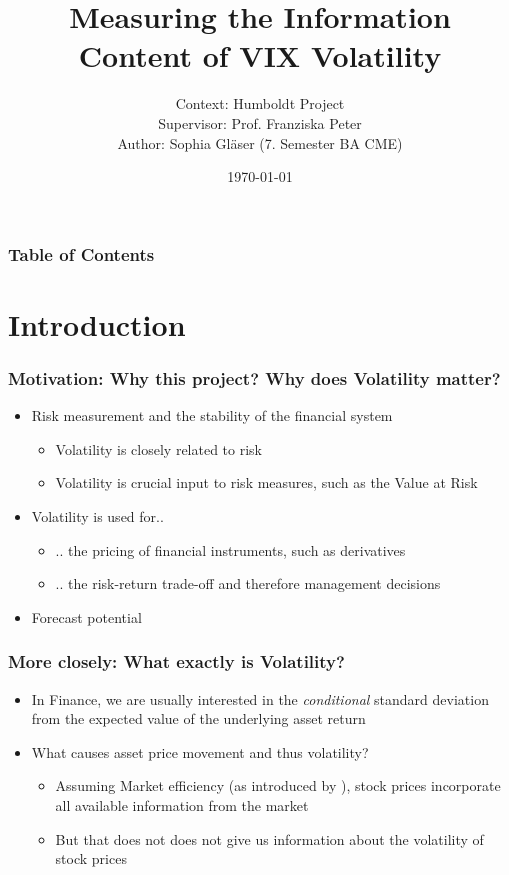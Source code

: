 \documentclass[aspectratio=169]{beamer}
\title{Measuring the Information Content of VIX Volatility}
\author{Context: Humboldt Project\\
Supervisor: Prof. Franziska Peter\\
Author: Sophia Gläser (7. Semester BA CME)}
\date{\small \today}
\begin{document}
\begin{frame}
\maketitle
\end{frame}

\begin{frame}
\frametitle{Table of Contents}
\tableofcontents
\end{frame}

\section{Introduction}

\begin{frame}
\frametitle{Motivation: Why this project? Why does Volatility matter?}
	\begin{itemize}
	\item<1-> Risk measurement and the stability of the financial system
		\begin{itemize}
		\item<1-> Volatility is closely related to risk 
		\item<1-> Volatility is crucial input to risk measures, such as the Value at Risk
		\end{itemize}
	\item<2-> Volatility is used for..
		\begin{itemize}
		\item<2-> .. the pricing of financial instruments, such as derivatives
		\item<2-> .. the risk-return trade-off and therefore management decisions
		\end{itemize}
	\item<3-> Forecast potential
	\end{itemize}
\end{frame}

\begin{frame}
\frametitle{More closely: What exactly is Volatility?}
	\begin{itemize}
	\item<1-> In Finance, we are usually interested in the \textit{conditional} standard deviation from the expected value of the underlying asset return \parencite{tsay2005}
	\item<2-> What causes asset price movement and thus volatility?
		\begin{itemize}
		\item<3-> Assuming Market efficiency (as introduced by \citeauthor{fama1970}), stock prices incorporate all available information from the market
		\item<3-> But that does not does not give us information about the volatility of stock prices
		\end{itemize}
	\end{itemize}
\end{frame}
\end{document}
